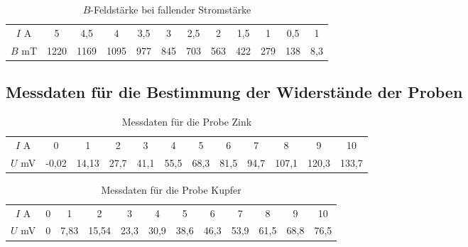 \begin{table}
 \centering
 \label{tab:Messergebnisse_Feldstärke_Ifällt}
 \begin{tabular}[width=\textwidth]{S S[table-format=4.0] S[table-format=4.1] S[table-format=4.0] S[table-format=3.1] S[table-format=3.0] S[table-format=3.1] S[table-format=3.0] S[table-format=3.1] S[table-format=3.0] S[table-format=3.1] S[table-format=3.1]}

     \midrule
      $I$  \si{\ampere} & 5 & 4,5 & 4 & 3,5 & 3 & 2,5 & 2 & 1,5 & 1 & 0,5 & 1 \\
      $B$  \si{\milli\tesla} & 1220 & 1169 & 1095 & 977 & 845 & 703 & 563 & 422 & 279 & 138 & 8,3 \\
      \bottomrule
\end{tabular}
  \caption{$B$-Feldstärke bei fallender Stromstärke}
\end{table}
\FloatBarrier

\subsection{Messdaten für die Bestimmung der Widerstände der Proben}

\begin{table}
 \centering
 \label{tab:Spannung_Zink}
 \begin{tabular}[width=\textwidth]{S S[table-format=1.2] S[table-format=2.2] S[table-format=2.1] S[table-format=2.1] S[table-format=2.1] S[table-format=2.1] S[table-format=2.1] S[table-format=2.1] S[table-format=3.1] S[table-format=3.1] S[table-format=3.1]}

     \midrule
      $I$  \si{\ampere} & 0 & 1 & 2 & 3 & 4 & 5 & 6 & 7 & 8 & 9 & 10 \\
      $U$  \si{\milli\volt} & -0,02 & 14,13 & 27,7 & 41,1 & 55,5 & 68,3 & 81,5 & 94,7 & 107,1 & 120,3 & 133,7 \\
      \bottomrule
\end{tabular}
  \caption{Messdaten für die Probe Zink}
\end{table}


\begin{table}
 \centering
 \label{tab:Spannung_Kupfer}
 \begin{tabular}[width=\textwidth]{S S[table-format=1.2] S[table-format=2.2] S[table-format=2.1] S[table-format=2.1] S[table-format=2.1] S[table-format=2.1] S[table-format=2.1] S[table-format=2.1] S[table-format=3.1] S[table-format=3.1] S[table-format=3.1]}

     \midrule
      $I$  \si{\ampere} & 0 & 1 & 2 & 3 & 4 & 5 & 6 & 7 & 8 & 9 & 10 \\
      $U$  \si{\milli\volt} & 0 & 7,83 & 15,54 & 23,3 & 30,9 & 38,6 & 46,3 & 53,9 & 61,5 & 68,8 & 76,5\\
      \bottomrule
\end{tabular}
  \caption{Messdaten für die Probe Kupfer}
\end{table}
\FloatBarrier

